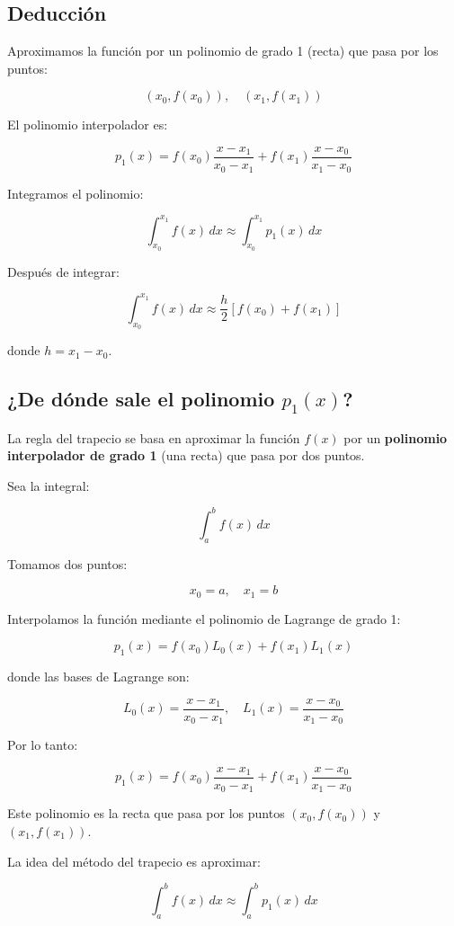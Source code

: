 \documentclass[12pt,a4paper]{article}
\begin{document}
\subsection{Deducción}

Aproximamos la función por un polinomio de grado 1 (recta) que pasa por los puntos:

\[
(x_0, f(x_0)), \quad (x_1, f(x_1))
\]

El polinomio interpolador es:

\[
p_1(x) = f(x_0)\frac{x - x_1}{x_0 - x_1} + f(x_1)\frac{x - x_0}{x_1 - x_0}
\]

Integramos el polinomio:

\[
\int_{x_0}^{x_1} f(x)\,dx \approx \int_{x_0}^{x_1} p_1(x)\,dx
\]

Después de integrar:

\[
\int_{x_0}^{x_1} f(x)\,dx \approx \frac{h}{2} \left[ f(x_0) + f(x_1) \right]
\]

donde $h = x_1 - x_0$.


\subsection{¿De dónde sale el polinomio $p_1(x)$?}

La regla del trapecio se basa en aproximar la función $f(x)$ por un 
\textbf{polinomio interpolador de grado 1} (una recta) que pasa por dos puntos.

Sea la integral:

\[
\int_a^b f(x)\,dx
\]

Tomamos dos puntos:

\[
x_0 = a, \quad x_1 = b
\]

Interpolamos la función mediante el polinomio de Lagrange de grado 1:

\[
p_1(x) = f(x_0)L_0(x) + f(x_1)L_1(x)
\]

donde las bases de Lagrange son:

\[
L_0(x) = \frac{x - x_1}{x_0 - x_1}, 
\quad
L_1(x) = \frac{x - x_0}{x_1 - x_0}
\]

Por lo tanto:

\[
p_1(x) = f(x_0)\frac{x - x_1}{x_0 - x_1}
+ f(x_1)\frac{x - x_0}{x_1 - x_0}
\]

Este polinomio es la recta que pasa por los puntos $(x_0, f(x_0))$ y $(x_1, f(x_1))$.

La idea del método del trapecio es aproximar:

\[
\int_a^b f(x)\,dx \approx \int_a^b p_1(x)\,dx
\]
\end{document}
